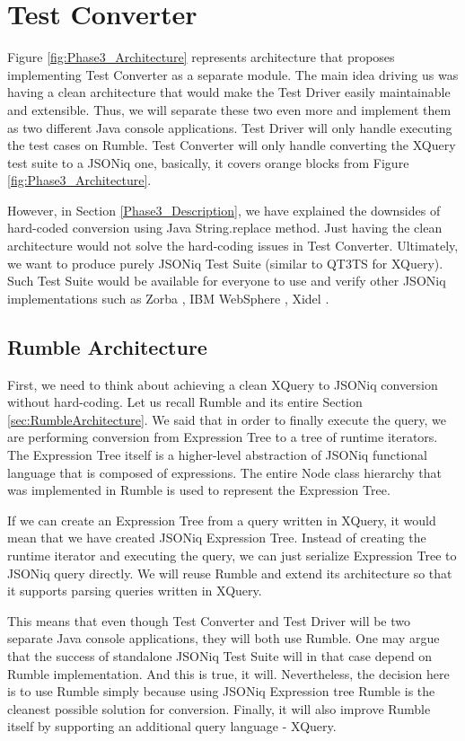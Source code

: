 
\chapter{Test Converter}
Figure \ref{fig:Phase3_Architecture} represents architecture that proposes implementing Test Converter as a separate module. The main idea driving us was having a clean architecture that would make the Test Driver easily maintainable and extensible. Thus, we will separate these two even more and implement them as two different Java console applications. Test Driver will only handle executing the test cases on Rumble. Test Converter will only handle converting the XQuery test suite to a JSONiq one, basically, it covers orange blocks from Figure \ref{fig:Phase3_Architecture}. 

However, in Section \ref{Phase3_Description}, we have explained the downsides of hard-coded conversion using Java String.replace method. Just having the clean architecture would not solve the hard-coding issues in Test Converter. Ultimately, we want to produce purely JSONiq Test Suite (similar to QT3TS for XQuery). Such Test Suite would be available for everyone to use and verify other JSONiq implementations such as Zorba \cite{Zorba}, IBM WebSphere \cite{WebSphere}, Xidel \cite{Xidel}.

\section{Rumble Architecture}
First, we need to think about achieving a clean XQuery to JSONiq conversion without hard-coding. Let us recall Rumble and its entire Section \ref{sec:RumbleArchitecture}. We said that in order to finally execute the query, we are performing conversion from Expression Tree to a tree of runtime iterators. The Expression Tree itself is a higher-level abstraction of JSONiq functional language that is composed of expressions. The entire Node class hierarchy that was implemented in Rumble is used to represent the Expression Tree.

If we can create an Expression Tree from a query written in XQuery, it would mean that we have created JSONiq Expression Tree. Instead of creating the runtime iterator and executing the query, we can just serialize Expression Tree to JSONiq query directly. We will reuse Rumble and extend its architecture so that it supports parsing queries written in XQuery. 

This means that even though Test Converter and Test Driver will be two separate Java console applications, they will both use Rumble. One may argue that the success of standalone JSONiq Test Suite will in that case depend on Rumble implementation. And this is true, it will. Nevertheless, the decision here is to use Rumble simply because using JSONiq Expression tree Rumble is the cleanest possible solution for conversion. Finally, it will also improve Rumble itself by supporting an additional query language - XQuery.

